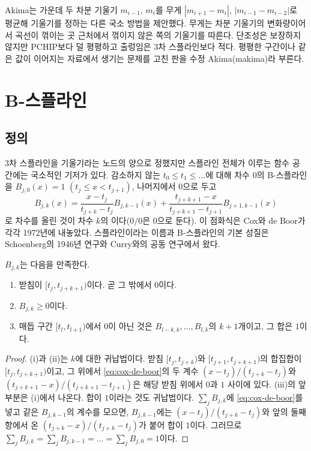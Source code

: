 Akima는 가운데 두 차분 기울기 $m_{i-1}$, $m_i$를 무게 $|m_{i+1}-m_i|$, $|m_{i-1}-m_{i-2}|$로 평균해 기울기를 정하는 다른 국소 방법을 제안했다\cite{akima1970}. 무게는 차분 기울기의 변화량이어서 곡선이 꺾이는 곳 근처에서 꺾이지 않은 쪽의 기울기를 따른다. 단조성은 보장하지 않지만 PCHIP보다 덜 평평하고 출렁임은 3차 스플라인보다 적다. 평평한 구간이나 같은 값이 이어지는 자료에서 생기는 문제를 고친 판을 수정 Akima(makima)라 부른다.

\section{B-스플라인}
\label{sec:bspline}

\subsection{정의}

3차 스플라인을 기울기라는 노드의 양으로 정했지만 스플라인 전체가 이루는 함수 공간에는 국소적인 기저가 있다. 감소하지 않는  $t_0\le t_1\le\dots$에 대해 차수 $0$의 B-스플라인을 $B_{j,0}(x)=1$ $(t_j\le x<t_{j+1})$, 나머지에서 $0$으로 두고
\begin{equation}
\label{eq:cox-de-boor}
B_{j,k}(x)=\frac{x-t_j}{t_{j+k}-t_j}B_{j,k-1}(x)+\frac{t_{j+k+1}-x}{t_{j+k+1}-t_{j+1}}B_{j+1,k-1}(x)
\end{equation}
로 차수를 올린 것이 차수 $k$의 이다($0/0$은 $0$으로 둔다). 이 점화식은 Cox와 de Boor가 각각 1972년에 내놓았다\cite{cox1972,deboor1972}. 스플라인이라는 이름과 B-스플라인의 기본 성질은 Schoenberg의 1946년 연구와 Curry와의 공동 연구에서 왔다\cite{schoenberg1946,curry1966}.

\begin{proposition}
\label{prop:bspline-properties}
$B_{j,k}$는 다음을 만족한다.
\begin{enumerate}
\item 받침이 $[t_j,t_{j+k+1})$이다. 곧 그 밖에서 $0$이다.
\item $B_{j,k}\ge0$이다.
\item 매듭 구간 $[t_l,t_{l+1})$에서 $0$이 아닌 것은 $B_{l-k,k},\dots,B_{l,k}$의 $k+1$개이고, 그 합은 $1$이다.
\end{enumerate}
\end{proposition}

\begin{proof}
(i)과 (ii)는 $k$에 대한 귀납법이다. 받침 $[t_j,t_{j+k})$와 $[t_{j+1},t_{j+k+1})$의 합집합이 $[t_j,t_{j+k+1})$이고, 그 위에서 \eqref{eq:cox-de-boor}의 두 계수 $(x-t_j)/(t_{j+k}-t_j)$와 $(t_{j+k+1}-x)/(t_{j+k+1}-t_{j+1})$은 해당 받침 위에서 $0$과 $1$ 사이에 있다. (iii)의 앞부분은 (i)에서 나온다. 합이 $1$이라는 것도 귀납법이다. $\sum_jB_{j,k}$에 \eqref{eq:cox-de-boor}를 넣고 같은 $B_{j,k-1}$의 계수를 모으면, $B_{j,k-1}$에는 $(x-t_j)/(t_{j+k}-t_j)$와 앞의 둘째 항에서 온 $(t_{j+k}-x)/(t_{j+k}-t_j)$가 붙어 합이 $1$이다. 그러므로 $\sum_jB_{j,k}=\sum_jB_{j,k-1}=\dots=\sum_jB_{j,0}=1$이다.
\end{proof}

